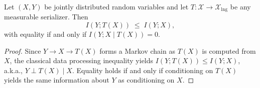 \begin{lemma}
\label{lem:dpi}
Let $(X,Y)$ be jointly distributed random variables and let $T:\mathcal{X}\to\mathcal{X}_{\mathrm{lng}}$ be any measurable serializer. Then
\begin{equation}
I(Y;T(X))\;\le\;I(Y;X),
\end{equation}
with equality if and only if $I(Y;X\mid T(X))=0$.
\end{lemma}
\begin{proof}
Since $Y\to X\to T(X)$ forms a Markov chain as $T(X)$ is computed from $X$, the classical data processing inequality yields $I(Y;T(X))\le I(Y;X)$, a.k.a., $Y \perp T(X) \mid X$. Equality holds if and only if conditioning on $T(X)$ yields the same information about $Y$ as conditioning on $X$.
\end{proof}

